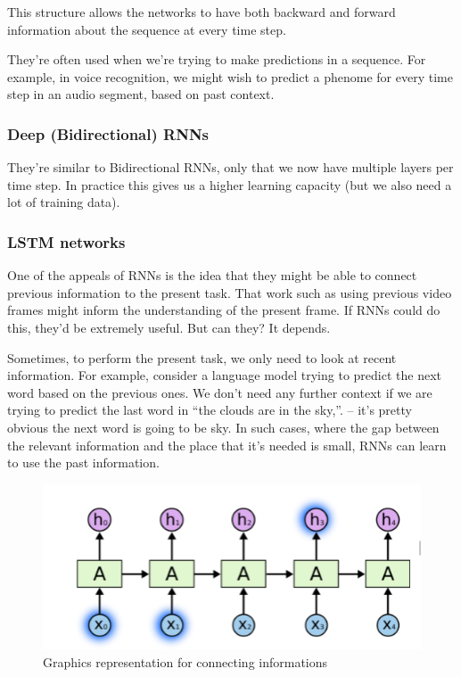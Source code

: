 This structure allows the networks to have both backward and forward information about the sequence at every time step.

They're often used when we’re trying to make predictions in a sequence. For example, in voice recognition, we might wish to predict a phenome for every time step in an audio segment, based on past context.

\subsubsection{Deep (Bidirectional) RNNs}

They're similar to Bidirectional RNNs, only that we now have multiple layers per time step. In practice this gives us a higher learning capacity (but we also need a lot of training data).

\subsubsection{LSTM networks}

One of the appeals of RNNs is the idea that they might be able to connect previous information to the present task. That work such as using previous video frames might inform the understanding of the present frame. If RNNs could do this, they’d be extremely useful. But can they? It depends.

Sometimes, to perform the present task, we only need to look at recent information. For example, consider a language model trying to predict the next word based on the previous ones. We don’t need any further context if we are trying to predict the last word in “the clouds are in the sky,”. – it’s pretty obvious the next word is going to be sky. In such cases, where the gap between the relevant information and the place that it’s needed is small, RNNs can learn to use the past information.


\begin{figure}[H]
    \centering
    \includegraphics[width=4.5in]{images/rnnWhatWeNeed.png}
    \caption{Graphics representation for connecting informations}
\end{figure}


